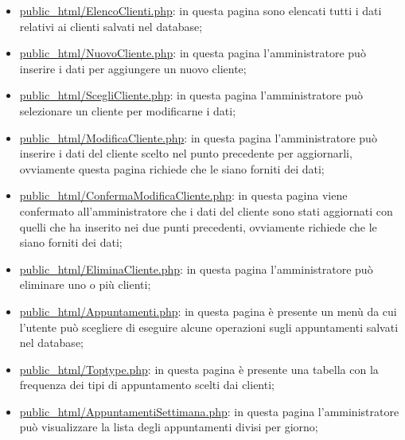 {\begin{itemize}
		\item \href{http://tecnologie-web.studenti.math.unipd.it/tecweb/~pgabelli/public\_html/ElencoClienti.php}{public\_html/ElencoClienti.php}: in questa pagina sono elencati tutti i dati relativi ai clienti salvati nel database;
		\item \href{http://tecnologie-web.studenti.math.unipd.it/tecweb/~pgabelli/public\_html/NuovoCliente.php}{public\_html/NuovoCliente.php}: in questa pagina l'amministratore può inserire i dati per aggiungere un nuovo cliente;
		\item \href{http://tecnologie-web.studenti.math.unipd.it/tecweb/~pgabelli/public\_html/ScegliCliente.php}{public\_html/ScegliCliente.php}: in questa pagina l'amministratore può selezionare un cliente per modificarne i dati;
		\item \href{http://tecnologie-web.studenti.math.unipd.it/tecweb/~pgabelli/public\_html/ModificaCliente.php}{public\_html/ModificaCliente.php}: in questa pagina l'amministratore può inserire i dati del cliente scelto nel punto precedente per aggiornarli, ovviamente questa pagina richiede che le siano forniti dei dati;
		\item \href{http://tecnologie-web.studenti.math.unipd.it/tecweb/~pgabelli/public\_html/ConfermaModificaCliente.php}{public\_html/ConfermaModificaCliente.php}: in questa pagina viene confermato all'amministratore che i dati del cliente sono stati aggiornati con quelli che ha inserito nei due punti precedenti, ovviamente richiede che le siano forniti dei dati;
		\item \href{http://tecnologie-web.studenti.math.unipd.it/tecweb/~pgabelli/public\_html/EliminaCliente.php}{public\_html/EliminaCliente.php}: in questa pagina l'amministratore può eliminare uno o più clienti;
		\item \href{http://tecnologie-web.studenti.math.unipd.it/tecweb/~pgabelli/public\_html/Appuntamenti.php}{public\_html/Appuntamenti.php}: in questa pagina è presente un menù da cui l'utente può scegliere di eseguire alcune operazioni sugli appuntamenti salvati nel database;
		\item \href{http://tecnologie-web.studenti.math.unipd.it/tecweb/~pgabelli/public\_html/Toptype.php}{public\_html/Toptype.php}: in questa pagina è presente una tabella con la frequenza dei tipi di appuntamento scelti dai clienti;
		\item \href{http://tecnologie-web.studenti.math.unipd.it/tecweb/~pgabelli/public\_html/AppuntamentiSettimana.php}{public\_html/AppuntamentiSettimana.php}: in questa pagina l'amministratore può visualizzare la lista degli appuntamenti divisi per giorno;

\end{itemize}}
